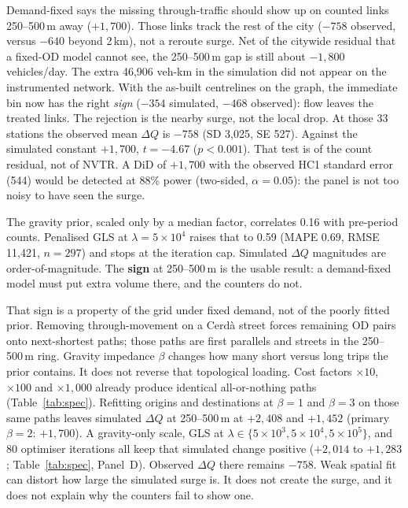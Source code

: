 \documentclass[a4paper,fleqn]{cas-dc}
\newcommand{\DQ}{\Delta Q}
\begin{document}
Demand-fixed says the missing through-traffic should show up on counted links
250--500\,m away ($+1{,}700$). Those links track the rest of the city ($-758$
observed, versus $-640$ beyond 2\,km), not a reroute surge. Net of the
citywide residual that a fixed-OD model cannot see, the 250--500\,m gap is
still about $-1{,}800$ vehicles/day. The extra 46{,}906 veh-km in the
simulation did not appear on the instrumented network. With the as-built
centrelines on the graph, the immediate bin now has the right \emph{sign}
($-354$ simulated, $-468$ observed): flow leaves the treated links. The
rejection is the nearby surge, not the local drop. At those 33 stations the
observed mean $\DQ$ is $-758$ (SD 3{,}025, SE 527). Against the simulated
constant $+1{,}700$, $t=-4.67$ ($p<0.001$). That test is of the count
residual, not of NVTR. A DiD of $+1{,}700$ with the observed HC1 standard
error (544) would be detected at 88\% power (two-sided, $\alpha=0.05$):
the panel is not too noisy to have seen the surge.

The gravity prior, scaled only by a median factor, correlates 0.16 with
pre-period counts. Penalised GLS at $\lambda=5\times 10^{4}$ raises that to
0.59 (MAPE 0.69, RMSE 11{,}421, $n=297$) and stops at the iteration cap.
Simulated $\DQ$ magnitudes are order-of-magnitude. The \textbf{sign} at
250--500\,m is the usable result: a demand-fixed model must put extra volume
there, and the counters do not.

That sign is a property of the grid under fixed demand, not of the poorly
fitted prior. Removing through-movement on a Cerd\`a street forces remaining
OD pairs onto next-shortest paths; those paths are first parallels and
streets in the 250--500\,m ring. Gravity impedance $\beta$ changes how many
short versus long trips the prior contains. It does not reverse that
topological loading. Cost factors $\times 10$, $\times 100$ and
$\times 1{,}000$ already produce identical all-or-nothing paths
(Table~\ref{tab:spec}). Refitting origins and destinations at $\beta=1$ and
$\beta=3$ on those same paths leaves simulated $\DQ$ at 250--500\,m at
$+2{,}408$ and $+1{,}452$ (primary $\beta=2$: $+1{,}700$). A gravity-only
scale, GLS at $\lambda \in \{5\times 10^{3},5\times 10^{4},5\times 10^{5}\}$,
and 80 optimiser iterations all keep that simulated change positive
($+2{,}014$ to $+1{,}283$; Table~\ref{tab:spec}, Panel~D). Observed $\DQ$
there remains $-758$. Weak spatial fit can distort how large the simulated
surge is. It does not create the surge, and it does not explain why the
counters fail to show one.
\end{document}
